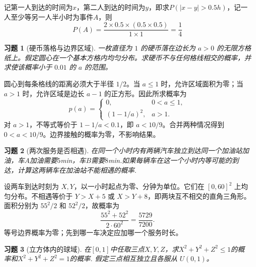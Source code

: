 \documentclass[UTF8,12pt,a4paper,fontset=fandol]{ctexart}
\newtheorem{exercise}{习题}[section]
\begin{document}
\begin{solve}\label{a:Y1.12}
记第一人到达的时间为$x$，第二人到达的时间为$y$，即求$P(|x-y|>0.5h)$，记一人至少等另一人半小时为事件$A$，则
\[P(A) = \frac{{2 \times 0.5 \times (0.5 \times 0.5)}}{1\times 1} = \frac{1}{4}\]
\end{solve}

\begin{exercise}[硬币落格与边界区域]\label{q:Y1.13}
一枚直径为 $1$ 的硬币落在边长为 $a>0$ 的无限方格纸上。假定圆心在一个基本方格内均匀分布。求硬币不与任何格线相交的概率，并求使该概率小于 $0.01$ 的 $a$ 的范围。\par{}
\end{exercise}

\begin{solve}\label{a:Y1.13}圆心到每条格线的距离必须大于半径 $1/2$。当 $a\le1$ 时，允许区域面积为零；当 $a>1$ 时，允许区域是边长 $a-1$ 的正方形。因此所求概率为\[p(a)=\begin{cases}0,&0<a\le1,\\(1-1/a)^2,&a>1.\end{cases}\]对 $a>1$，不等式等价于 $1-1/a<0.1$，即 $a<10/9$。合并两种情况得到 $0<a<10/9$。边界接触的概率为零，不影响结果。\end{solve}

\begin{exercise}[两次服务是否相遇]\label{q:Y1.14}
在同一个小时内有两辆汽车独立到达同一个加油站加油，车$A$加油需要$5$min，车$B$需要$8$min.如果每辆车在这一个小时内等可能的到达，计算这两辆车在加油站不能相遇的概率.\par{}
\end{exercise}

\begin{solve}\label{a:Y1.14}设两车到达时刻为 $X,Y$，以一小时起点为零、分钟为单位。它们在 $[0,60]^2$ 上均匀分布。不相遇等价于 $Y>X+5$ 或 $X>Y+8$，即两块互不相交的直角三角形。面积分别为 $55^2/2$ 和 $52^2/2$，故概率为\[\frac{55^2+52^2}{2\cdot60^2}=\frac{5729}{7200}.\]等号边界概率为零；先到哪一车决定应加哪一个服务时长。\end{solve}

\begin{exercise}[立方体内的球域]\label{q:Y1.15}
在$[0,1]$中任取三点$X,Y,Z$，求$X^2+Y^2+Z^2\leqslant 1$的概率和$X^2+Y^2+Z^2=1$的概率. 假定三点相互独立且各服从 $U(0,1)$。\par{}
\end{exercise}
\end{document}
